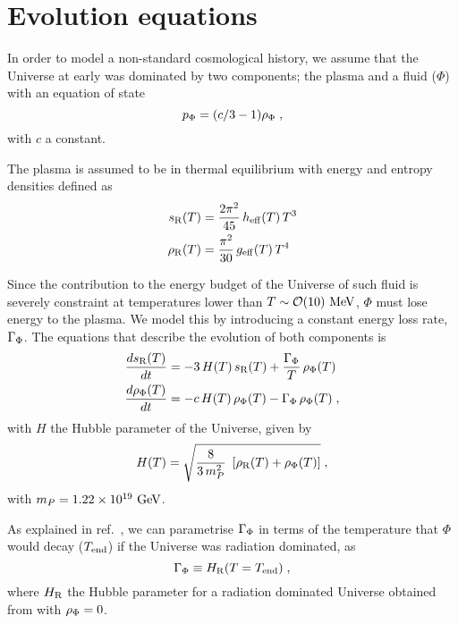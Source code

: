 \documentclass[11pt,a4paper]{article}
\begin{document}
\section{Evolution equations}\label{sec:equations}
\setcounter{equation}{0}

In order to model a non-standard cosmological history, we assume that the Universe at early was dominated by two components; the plasma and a fluid ($\Phi$) with an equation of state
%
\begin{equation}
	p_{\Phi} = (c/3-1) \rho_{\Phi} \;,
	\label{eq:EOS}
\end{equation}  
%
with $c$ a constant. 

The plasma is assumed to be in thermal equilibrium with energy and entropy densities defined as
%
\begin{align}
	s_{\rm R}(T)&=\dfrac{2\pi^2}{45} \,  h_{\rm eff}{}(T) \, T^3 \label{eq:s_def}\\
	\rho_{\rm R}(T)&=\dfrac{\pi^2}{30} \,  g_{\rm eff}{}(T) \, T^4 \label{eq:rho_def}
\end{align}
%


Since the contribution to the energy budget of the Universe of such fluid is severely constraint at temperatures lower than $T \sim \mathcal{O}(10)~{\rm MeV}$, $\Phi$ must lose energy to the plasma. We model this by introducing a constant energy loss rate, $\Gamma_{\Phi}$. The equations that describe the evolution of both components is
%
\begin{align}
	\dfrac{ds_{\rm R}(T)}{dt} &= -3 \, H(T)  \, s_{\rm R}(T) + \dfrac{\Gamma_{\Phi}}{T} \, \rho_{\Phi}(T) \label{eq:dsdt} \\ 
	\dfrac{d\rho_{\Phi}(T)}{dt} &= - c \, H(T) \, \rho_{\Phi}(T) - \Gamma_{\Phi} \, \rho_{\Phi}(T) \label{eq:drhoPhidt } \;,
\end{align}
%
with $H$ the Hubble parameter of the Universe, given by
%
\begin{equation}
	H(T) = \sqrt{\dfrac{8}{3\,m_P^2} \ \left[ \rho_{\rm R}(T) + \rho_{\Phi}(T) \right]}\;,
	\label{eq:H_def}
\end{equation}
%
with $m_P = 1.22 \times 10^{19}~{\rm GeV}$.
 

As explained in ref.~\cite{Arias:2020qty}, we can parametrise $\Gamma_{\Phi}$ in terms of the temperature that $\Phi$ would decay ($T_{\rm end}{}$) if the Universe was radiation dominated, as
%
\begin{equation}
	\Gamma_{\Phi} \equiv H_{\rm R}(T=T_{\rm end}{})\;,
	\label{eq:Tend_def}
\end{equation}
%
where $H_{\rm R}$ the Hubble parameter for a radiation dominated Universe obtained from  with $\rho_{\Phi}=0$.
\end{document}
